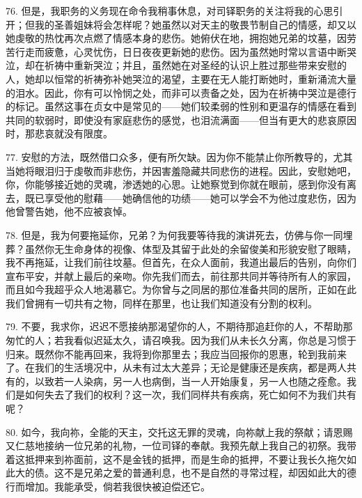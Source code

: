 76. 但是，我职务的义务现在命令我稍事休息，对司铎职务的关注将我的心思引开；但我的圣善姐妹将会怎样呢？她虽然以对天主的敬畏节制自己的情感，却又以她虔敬的热忱再次点燃了情感本身的悲伤。她俯伏在地，拥抱她兄弟的坟墓，因劳苦行走而疲惫，心灵忧伤，日日夜夜更新她的悲伤。因为虽然她时常以言语中断哭泣，却在祈祷中重新哭泣；并且，虽然她在对圣经的认识上胜过那些带来安慰的人，她却以恒常的祈祷弥补她哭泣的渴望，主要在无人能打断她时，重新涌流大量的泪水。因此，你有可以怜悯之处，而非可以责备之处，因为在祈祷中哭泣是德行的标记。虽然这事在贞女中是常见的——她们较柔弱的性别和更温存的情感在看到共同的软弱时，即使没有家庭悲伤的感觉，也泪流满面——但当有更大的悲哀原因时，那悲哀就没有限度。\par

77. 安慰的方法，既然借口众多，便有所欠缺。因为你不能禁止你所教导的，尤其当她将眼泪归于虔敬而非悲伤，并因害羞隐藏共同悲伤的进程。因此，安慰她吧，你，你能够接近她的灵魂，渗透她的心思。让她察觉到你就在眼前，感到你没有离去，既已享受他的慰藉——她确信他的功绩——她可以学会不为他过度悲伤，因为他曾警告她，他不应被哀悼。\par

78. 但是，我为何要拖延你，兄弟？为何我要等待我的演讲死去，仿佛与你一同埋葬？虽然你无生命身体的视像、体型及其留于此处的余留俊美和形貌安慰了眼睛，我不再拖延，让我们前往坟墓。但首先，在众人面前，我道出最后的告别，向你们宣布平安，并献上最后的亲吻。你先我们而去，前往那共同并等待所有人的家园，而且如今我超乎众人地渴慕它。为你曾与之同居的那位准备共同的居所，正如在此我们曾拥有一切共有之物，同样在那里，也让我们知道没有分割的权利。\par

79. 不要，我求你，迟迟不愿接纳那渴望你的人，不期待那追赶你的人，不帮助那匆忙的人；若我看似迟延太久，请召唤我。因为我们从未长久分离，你总是习惯于归来。既然你不能再回来，我将到你那里去；我应当回报你的恩惠，轮到我前来了。在我们的生活境况中，从未有过太大差异；无论是健康还是疾病，都是两人共有的，以致若一人染病，另一人也病倒，当一人开始康复，另一人也随之痊愈。我们是如何失去了我们的权利？这一次，我们同样共有疾病，死亡如何不为我们共有呢？\par

80. 如今，我向祢，全能的天主，交托这无罪的灵魂，向祢献上我的祭献；请恩赐又仁慈地接纳一位兄弟的礼物，一位司铎的奉献。我预先献上我自己的初祭。我带着这抵押来到祢面前，这不是金钱的抵押，而是生命的抵押，不要让我长久拖欠如此大的债。这不是兄弟之爱的普通利息，也不是自然的寻常过程，却因如此大的德行而增加。我能承受，倘若我很快被迫偿还它。\par


